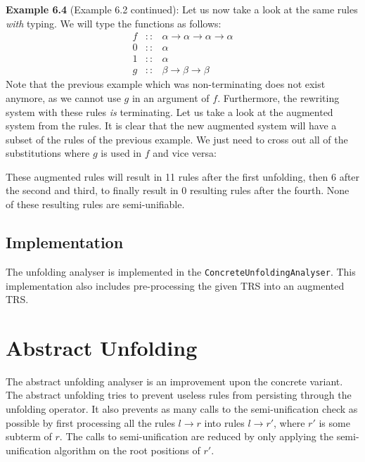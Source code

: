 \textbf{Example 6.4} (Example 6.2 continued): Let us now take a look at the same rules \textit{with} typing. We will type the functions as follows:
\[
\begin{array}{rcl}
    f & :: & \alpha \rightarrow \alpha \rightarrow \alpha \rightarrow \alpha \\
    0 & :: & \alpha \\
    1 & :: & \alpha \\
    g & :: & \beta \rightarrow \beta \rightarrow \beta 
\end{array}
\]
Note that the previous example which was non-terminating does not exist anymore, as we cannot use $g$ in an argument of $f$. Furthermore, the rewriting system with these rules \textit{is} terminating. Let us take a look at the augmented system from the rules. It is clear that the new augmented system will have a subset of the rules of the previous example. We just need to cross out all of the substitutions where $g$ is used in $f$ and vice versa:
\begin{center}
\end{center}
These augmented rules will result in 11 rules after the first unfolding, then 6 after the second and third, to finally result in 0 resulting rules after the fourth. None of these resulting rules are semi-unifiable. 

\subsection{Implementation}
The unfolding analyser is implemented in the \texttt{ConcreteUnfoldingAnalyser}. This implementation also includes pre-processing the given TRS into an augmented TRS.  

\section{Abstract Unfolding}
The abstract unfolding analyser is an improvement upon the concrete variant. The abstract unfolding tries to prevent useless rules from persisting through the unfolding operator. It also prevents as many calls to the semi-unification check as possible by first processing all the rules $l \rightarrow r$ into rules $l \rightarrow r'$, where $r'$ is some subterm of $r$. The calls to semi-unification are reduced by only applying the semi-unification algorithm on the root positions of $r'$. 

